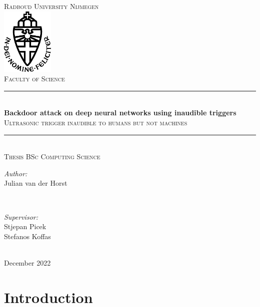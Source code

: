 \documentclass{article}
\title{\thesistitle}
\author{\thesisauthorfirst\space\thesisauthorsecond}
\date{\thesisdate}
\def\thesistitle{Backdoor attack on deep neural networks using inaudible triggers}
\def\thesissubtitle{Ultrasonic trigger inaudible to humans but not machines}
\def\thesisauthorfirst{Julian van der Horst}
\def\thesisauthorsecond{}
\def\thesissupervisorfirst{Stjepan Picek\\Stefanos Koffas}
\def\thesissupervisorsecond{}
\def\thesissecondreaderfirst{}
\def\thesissecondreadersecond{}
\def\thesisdate{December 2022}
\theoremstyle{definition}
\theoremstyle{remark}
\begin{document}
\begin{titlepage}
	\thispagestyle{empty}
	\newcommand{\HRule}{\rule{\linewidth}{0.5mm}}
	\center
	\textsc{\Large Radboud University Nijmegen}\\[.7cm]
	\includegraphics[width=25mm]{img/in_dei_nomine_feliciter.eps}\\[.5cm]
	\textsc{Faculty of Science}\\[0.5cm]
	
	\HRule \\[0.4cm]
	{ \huge \bfseries \thesistitle}\\[0.1cm]
	\textsc{\thesissubtitle}\\
	\HRule \\[.5cm]
	\textsc{\large Thesis BSc Computing Science}\\[.5cm]
	
	\begin{minipage}{0.4\textwidth}
	\begin{flushleft} \large
	\emph{Author:}\\
	\thesisauthorfirst\space \textsc{\thesisauthorsecond}
	\end{flushleft}
	\end{minipage}
	~
	\begin{minipage}{0.4\textwidth}
	\begin{flushright} \large
	\emph{Supervisor:} \\
	\thesissupervisorfirst\space \textsc{\thesissupervisorsecond} \\[1em]
	\end{flushright}
	\end{minipage}\\[4cm]
	\vfill
	{\large \thesisdate}\\
	\clearpage
\end{titlepage}

\tableofcontents

\newpage
\section{Introduction}
\end{document}
